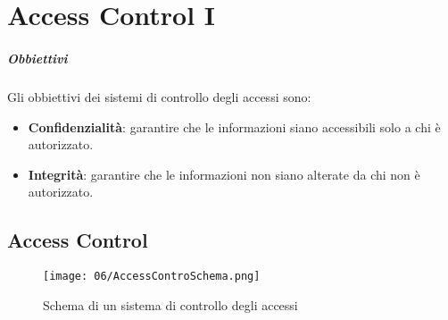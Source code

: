 \chapter{Access Control I}
\label{chap:accessControl}
\thispagestyle{chapterInit}

\paragraph{Obbiettivi} Gli obbiettivi dei sistemi di controllo degli accessi sono:
    \begin{itemize}
        \item \textbf{Confidenzialità}: garantire che le informazioni siano accessibili solo a chi è autorizzato.
        \item \textbf{Integrità}: garantire che le informazioni non siano alterate da chi non è autorizzato.
    \end{itemize}

\section{Access Control}
    \begin{figure}[H]
        \label{fig:accessControlSchema}
        \centering
        \texttt{[image: 06/AccessControSchema.png]}
        \caption{Schema di un sistema di controllo degli accessi}
    \end{figure}

